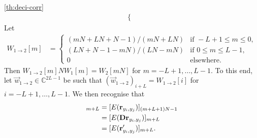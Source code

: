 \documentclass[a4paper, openany, oneside]{memoir}
\begin{document}
\begin{blockProofTheorem}{\ref{th:deci-corr}}
\begin{align*}
\begin{cases}
        \end{cases}
    \end{align*}
    Let
    \begin{align*}
        W_{1 \to 2}[m] &= \begin{cases}
            (mN+LN+N-1)/(mN+LN) & \text{if } -L+1 \le m \le 0, \\
            (LN+N-1-mN)/(LN-mN) & \text{if } 0 \le m \le L-1, \\
            0 & \text{elsewhere.}
        \end{cases}
    \end{align*}
    Then $W_{1 \to 2}[m] N W_1[m] = W_2[mN]$ for $m = -L+1,\ldots,L-1$. To this end, let $\vec{w}_{1 \to 2} \in \mathbb{C}^{2L-1}$ be such that $(\vec{w}_{1 \to 2})_{i+L}=W_{1 \to 2}[i]$ for $i = -L+1,\ldots,L-1$. We then recognise that
    \begin{align*}
        [E(\vec{w}_{1 \to 2} \odot N\vec{r}_{y'_i,y'_j})]_{m+L} &= [E(\vec{r}_{y_i,y_j})]_{(m+L+1)N-1} \\
        &= [E(\mat{D} \vec{r}_{y_i,y_j})]_{m+L} \\
        &= [E(\vec{r}'_{y_i,y_j})]_{m+L}.
    \end{align*}
\end{blockProofTheorem}
\end{document}
